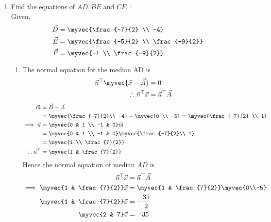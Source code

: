 \documentclass[11pt]{book}
\begin{document}
\begin{enumerate}[label=\thesection.\arabic*.,ref=\thesection.\theenumi]
        \item Find the equations of $AD, BE$ and $CF$.
        \solution:\\
        Given, 
        \begin{align}
        \vec{D} &= \myvec{\frac{-7}{2} \\ -4}\\
        \vec{E} &= \myvec{\frac{-5}{2} \\ \frac{-9}{2}}\\
        \vec{F} &= \myvec{-1 \\ \frac{-9}{2}}
        \end{align}
        \begin{enumerate}
       \item The normal equation for the median AD is
        \begin{align}
        \vec{n}^{\top}\myvec{\vec{x}-\vec{A}} &= 0\\
         \therefore \vec{n}^{\top}\vec{x} &=  \vec{n}^{\top}\vec{A}
        \end{align}
\begin{align}
	\vec{m} &= \vec{D}- \vec{A} \\
&=\myvec{\frac{-7}{2}\\ -4} - \myvec{0 \\ -5}
	 =\myvec{\frac{-7}{2} \\ 1}\\
 	\implies  \vec{n} &=\myvec{0 & 1 \\ -1 & 0} \vec{m}\\
  &= \myvec{0 & 1 \\ -1 & 0} \myvec{\frac{-7}{2}\\ 1}\\
  &= \myvec{1 \\ \frac{7}{2}}\\
  \therefore \vec{n}^{\top} &= \myvec{1 & \frac{7}{2}}
\end{align}
Hence the normal equation of median $AD$ is 
\begin{align}
\vec{n}^{\top}\vec{x} &= \vec{n}^{\top}\vec{A}\\
\implies \myvec{1 & \frac{7}{2}}\vec{x} &= \myvec{1 & \frac{7}{2}}\myvec{0\\-5}\\
   \myvec{1 & \frac{7}{2}}\vec{x} &= -\frac{35}{2}\\
	\myvec{2 & 7}\vec{x} &= -35
\end{align}


\end{enumerate}
\end{enumerate}
\end{document}

